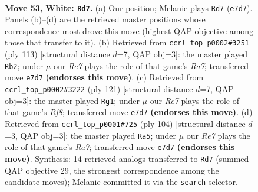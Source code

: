 \documentclass[11pt]{article}
\begin{document}
\clearpage

\begin{figure}[p]\centering
\begin{subfigure}{0.46\textwidth}\centering
\resizebox{\linewidth}{!}{%
\newchessgame
\chessboard[
  setfen={5rk1/4R3/8/P7/7K/8/8/8 w - - 9 53},
  showmover=false,
  pgfstyle=straightmove, color=movearrow, markmove={e7-d7}
]}
\caption{}
\end{subfigure}\hfill
\begin{subfigure}{0.46\textwidth}\centering
\resizebox{\linewidth}{!}{%
\newchessgame
\chessboard[
  setfen={8/8/8/5k1p/7P/8/r7/6RK b - - 4 57},
  showmover=false,
  pgfstyle=straightmove, color=movearrow, markmove={a2-b2}
]}
\caption{}
\end{subfigure}
\\[4pt]
\begin{subfigure}{0.46\textwidth}\centering
\resizebox{\linewidth}{!}{%
\newchessgame
\chessboard[
  setfen={4K3/4R1P1/8/8/1p1k4/8/8/5r2 b - - 20 61},
  showmover=false,
  pgfstyle=straightmove, color=movearrow, markmove={f1-g1}
]}
\caption{}
\end{subfigure}\hfill
\begin{subfigure}{0.46\textwidth}\centering
\resizebox{\linewidth}{!}{%
\newchessgame
\chessboard[
  setfen={8/R7/3rk3/6p1/6P1/8/6K1/8 w - - 3 53},
  showmover=false,
  pgfstyle=straightmove, color=movearrow, markmove={a7-a5}
]}
\caption{}
\end{subfigure}
\caption{\textbf{Move 53, White: \texttt{Rd7}.} (a) Our position; Melanie plays \texttt{Rd7} (\texttt{e7d7}). Panels (b)--(d) are the retrieved master positions whose correspondence most drove this move (highest QAP objective among those that transfer to it). (b) Retrieved from \texttt{ccrl\_top\_p0002\#3251} (ply 113) [structural distance $d$=7, QAP obj=3]: the master played \texttt{Rb2}; under $\mu$ our \emph{Re7} plays the role of that game's \emph{Ra7}; transferred move \texttt{e7d7} \textbf{(endorses this move)}. (c) Retrieved from \texttt{ccrl\_top\_p0002\#3222} (ply 121) [structural distance $d$=7, QAP obj=3]: the master played \texttt{Rg1}; under $\mu$ our \emph{Re7} plays the role of that game's \emph{Rf8}; transferred move \texttt{e7d7} \textbf{(endorses this move)}. (d) Retrieved from \texttt{ccrl\_top\_p0001\#725} (ply 104) [structural distance $d$=3, QAP obj=3]: the master played \texttt{Ra5}; under $\mu$ our \emph{Re7} plays the role of that game's \emph{Ra7}; transferred move \texttt{e7d7} \textbf{(endorses this move)}. Synthesis: 14 retrieved analogs transferred to \texttt{Rd7} (summed QAP objective 29, the strongest correspondence among the candidate moves); Melanie committed it via the \texttt{search} selector.}
\label{fig:thought-m104}
\end{figure}
\end{document}
